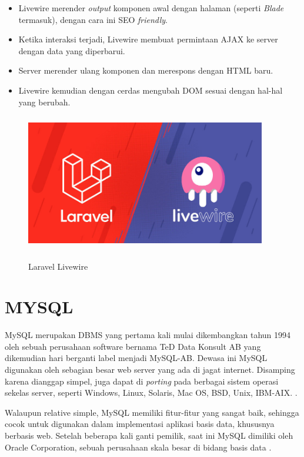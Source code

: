 \begin{itemize}
	\item Livewire merender \textit{output} komponen awal dengan halaman (seperti \textit{Blade} termasuk), dengan cara ini SEO \textit{friendly}.
	\item Ketika interaksi terjadi, Livewire membuat permintaan AJAX ke server dengan data yang diperbarui.
	\item Server merender ulang komponen dan merespons dengan HTML baru.
	\item Livewire kemudian dengan cerdas mengubah DOM sesuai dengan hal-hal yang berubah.
\end{itemize}

\begin{figure}[H]
\centering
{\includegraphics [width = 10.5cm, height= 6cm]{gambar/laravel-livewire}}
\caption{Laravel Livewire}
\label{laravel_livewire}
\end{figure}

\section{\uppercase{MySQL}}
MySQL merupakan DBMS yang pertama kali mulai dikembangkan tahun 1994 oleh sebuah perusahaan software bernama TeD Data Konsult AB yang dikemudian hari berganti label menjadi MySQL-AB. Dewasa ini MySQL digunakan oleh sebagian besar web server yang ada di jagat internet. Disamping karena dianggap simpel, juga dapat di \textit{porting} pada berbagai sistem operasi sekelas server, seperti Windows, Linux, Solaris, Mac OS, BSD, Unix, IBM-AIX. \citep{fathansyah2012}.

\par Walaupun relative simple, MySQL memiliki fitur-fitur yang sangat baik, sehingga cocok untuk digunakan dalam implementasi aplikasi basis data, khususnya berbasis web. Setelah beberapa kali ganti pemilik, saat ini MySQL dimiliki oleh Oracle Corporation, sebuah perusahaan skala besar di bidang basis data \citep{fathansyah2012}.

